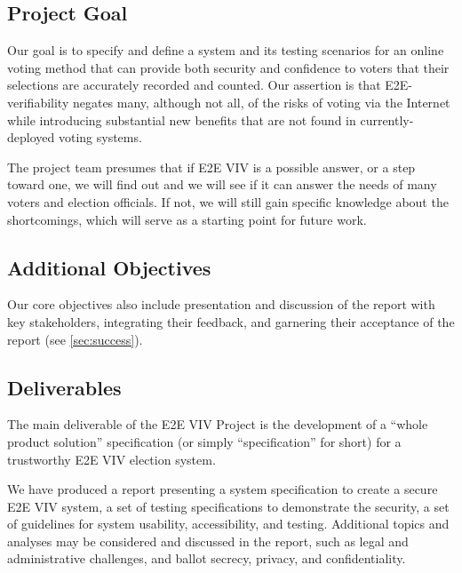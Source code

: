 \subsection{Project Goal}
\label{sec:project-goal}

Our goal is to specify and define a system and its testing scenarios
for an online voting method that can provide both security and
confidence to voters that their selections are accurately recorded and
counted. Our assertion is that E2E-verifiability negates many,
although not all, of the risks of voting via the Internet while
introducing substantial new benefits that are not found in
currently-deployed voting systems.

The project team presumes that if E2E VIV is a possible answer, or a
step toward one, we will find out and we will see if it can answer the
needs of many voters and election officials. If not, we will still
gain specific knowledge about the shortcomings, which will serve as a
starting point for future work.

\subsection{Additional Objectives}
\label{sec:addit-object}

Our core objectives also include presentation and discussion of the
report with key stakeholders, integrating their feedback, and
garnering their acceptance of the report (see \autoref{sec:success}).

\subsection{Deliverables}
\label{sec:deliverables}

The main deliverable of the E2E VIV Project is the development of a
``whole product solution'' specification (or simply ``specification''
for short) for a trustworthy E2E VIV election system.

We have produced a report presenting a system specification to create
a secure E2E VIV system, a set of testing specifications to
demonstrate the security, a set of guidelines for system usability,
accessibility, and testing. Additional topics and analyses may be
considered and discussed in the report, such as legal and
administrative challenges, and ballot secrecy, privacy, and
confidentiality.

